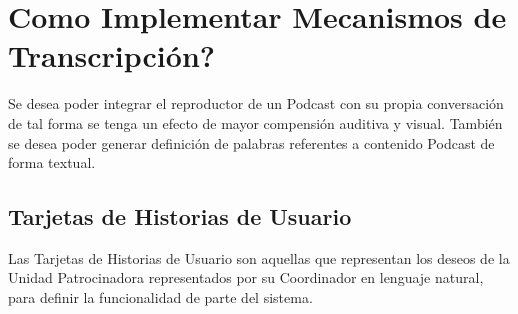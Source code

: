 \section{\textquestiondown Como Implementar Mecanismos de Transcripci\'{o}n?}

Se desea poder integrar el reproductor de un Podcast con su propia conversaci\'{o}n
de tal forma se tenga un efecto de mayor compensi\'{o}n auditiva y visual.
Tambi\'{e}n se desea poder generar definici\'{o}n de palabras referentes a contenido
Podcast de forma textual.
 
\subsection{Tarjetas de Historias de Usuario}

Las Tarjetas de Historias de Usuario son aquellas que representan los deseos de la
Unidad Patrocinadora representados por su Coordinador en lenguaje natural, para 
definir la funcionalidad de parte del sistema.


